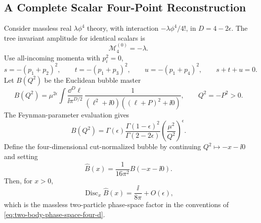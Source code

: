\subsection{A Complete Scalar Four-Point Reconstruction}
\label{subsec:scalar-four-point-generalized-unitarity}

Consider massless real \(\lambda\phi^4\) theory, with interaction
\(-\lambda\phi^4/4!\), in \(D=4-2\epsilon\).  The tree invariant amplitude
for identical scalars is
\[
  \mathcal M_4^{(0)}=-\lambda .
\]
Use all-incoming momenta with \(p_i^2=0\),
\[
  s=-(p_1+p_2)^2,\qquad
  t=-(p_1+p_3)^2,\qquad
  u=-(p_1+p_4)^2,\qquad
  s+t+u=0 .
\]
Let \(B(Q^2)\) be the Euclidean bubble master
\begin{equation}
  B(Q^2)
  =
  \mu^{2\epsilon}
  \int
  \frac{\dd^D\ell}{\ii\pi^{D/2}}\,
  \frac{1}
       {(\ell^2+\ii0)((\ell+P)^2+\ii0)},
  \qquad
  Q^2=-P^2>0 .
  \label{eq:unitarity-bubble-master-definition}
\end{equation}
The Feynman-parameter evaluation gives
\begin{equation}
  B(Q^2)
  =
  \Gamma(\epsilon)
  \frac{\Gamma(1-\epsilon)^2}{\Gamma(2-2\epsilon)}
  \left(\frac{\mu^2}{Q^2}\right)^\epsilon .
  \label{eq:unitarity-bubble-master-gamma-form}
\end{equation}
Define the four-dimensional cut-normalized bubble by continuing
\(Q^2\mapsto -x-\ii0\) and setting
\[
  \widehat B(x)=\frac1{16\pi^2}B(-x-\ii0).
\]
Then, for \(x>0\),
\begin{equation}
  \operatorname{Disc}_x\widehat B(x)
  =
  \frac{\ii}{8\pi}+O(\epsilon),
  \label{eq:unitarity-cut-normalized-bubble-disc}
\end{equation}
which is the massless two-particle phase-space factor in the conventions of
\eqref{eq:two-body-phase-space-four-d}.

